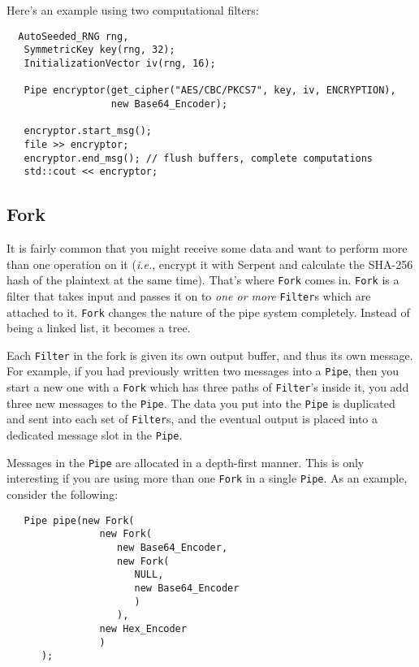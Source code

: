 \documentclass{article}
\newcommand{\type}[1]{\texttt{#1}}
\newcommand{\ie}[0]{\emph{i.e.}}
\begin{document}
Here's an example using two computational filters:

\begin{verbatim}
  AutoSeeded_RNG rng,
   SymmetricKey key(rng, 32);
   InitializationVector iv(rng, 16);

   Pipe encryptor(get_cipher("AES/CBC/PKCS7", key, iv, ENCRYPTION),
                  new Base64_Encoder);

   encryptor.start_msg();
   file >> encryptor;
   encryptor.end_msg(); // flush buffers, complete computations
   std::cout << encryptor;
\end{verbatim}

\subsection{Fork}

It is fairly common that you might receive some data and want to
perform more than one operation on it (\ie, encrypt it with Serpent
and calculate the SHA-256 hash of the plaintext at the same
time). That's where \type{Fork} comes in. \type{Fork} is a filter that
takes input and passes it on to \emph{one or more} \type{Filter}s
which are attached to it. \type{Fork} changes the nature of the pipe
system completely. Instead of being a linked list, it becomes a tree.

Each \type{Filter} in the fork is given its own output buffer, and
thus its own message. For example, if you had previously written two
messages into a \type{Pipe}, then you start a new one with a
\type{Fork} which has three paths of \type{Filter}'s inside it, you
add three new messages to the \type{Pipe}. The data you put into the
\type{Pipe} is duplicated and sent into each set of \type{Filter}s,
and the eventual output is placed into a dedicated message slot in the
\type{Pipe}.

Messages in the \type{Pipe} are allocated in a depth-first manner. This is only
interesting if you are using more than one \type{Fork} in a single \type{Pipe}.
As an example, consider the following:

\begin{verbatim}
   Pipe pipe(new Fork(
                new Fork(
                   new Base64_Encoder,
                   new Fork(
                      NULL,
                      new Base64_Encoder
                      )
                   ),
                new Hex_Encoder
                )
      );
\end{verbatim}
\end{document}
